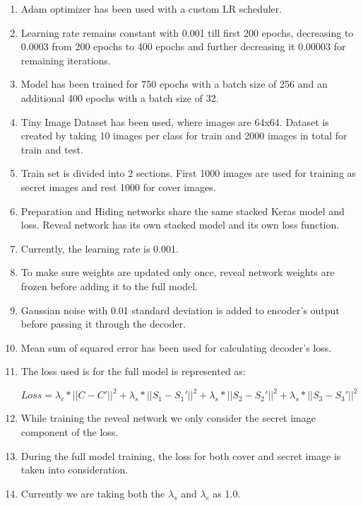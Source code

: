 \documentclass{article}
\begin{document}
\begin{enumerate}
    \item Adam optimizer has been used with a custom LR scheduler.
    \item Learning rate remains constant with 0.001 till first 200 epochs, decreasing to 0.0003 from 200 epochs to 400 epochs and further decreasing it 0.00003 for remaining iterations.
    \item Model has been trained for 750 epochs with a batch size of 256 and an additional 400 epochs with a batch size of 32. 
    \item Tiny Image Dataset has been used, where images are 64x64. Dataset is created by taking 10 images per class for train and 2000 images in total for train and test.
    \item Train set is divided into 2 sections. First 1000 images are used for training as secret images and rest 1000 for cover images.
    \item Preparation and Hiding networks share the same stacked Keras model and loss. Reveal network has its own stacked model and its own loss function. 
    \item Currently, the learning rate is 0.001. 
    \item To make sure weights are updated only once, reveal network weights are frozen before adding it to the full model.
    \item Gaussian noise with 0.01 standard deviation is added to encoder's output before passing it through the decoder.
    \item Mean sum of squared error has been used for calculating decoder's loss.
    \item The loss used is for the full model is represented as:
    \begin{center}
        $Loss = \lambda_c*||C-C'||^2 + \lambda_s*||S_1 - S_1'||^2 + \lambda_s*||S_2 - S_2'||^2 + \lambda_s*||S_3 - S_3'||^2$
    \end{center}
    \item While training the reveal network we only consider the secret image component of the loss.
    \item During the full model training, the loss for both cover and secret image is taken into consideration.
    \item Currently we are taking both the $\lambda_s$ and $\lambda_c$ as 1.0.
\end{enumerate}



\end{document}
